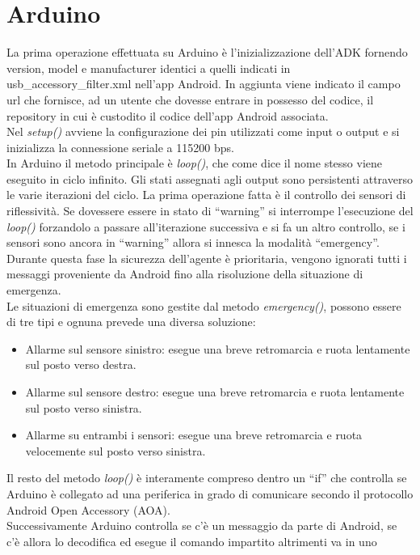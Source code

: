 \section {Arduino} 
La prima operazione effettuata su Arduino è l'inizializzazione dell'ADK fornendo 
version, model e manufacturer identici a quelli indicati in usb\_accessory\_filter.xml 
nell'app Android. In aggiunta viene indicato il campo url che fornisce, ad un utente
che dovesse entrare in possesso del codice, il repository in cui è custodito il 
codice dell'app Android associata.\\
Nel \emph{setup()} avviene la configurazione dei pin utilizzati come input o output e si inizializza
la connessione seriale a 115200 bps.\\
In Arduino il metodo principale è \emph{loop()}, che come dice il nome stesso viene eseguito
in ciclo infinito. Gli stati assegnati agli output sono persistenti attraverso 
le varie iterazioni del ciclo.
La prima operazione fatta è il controllo dei sensori di riflessività. Se dovessere 
essere in stato di ``warning'' si interrompe l'esecuzione del \emph{loop()} 
forzandolo a passare all'iterazione successiva e si fa un altro controllo, se i 
sensori sono ancora in ``warning'' allora si innesca la modalità ``emergency''.
Durante questa fase la sicurezza dell'agente è prioritaria, vengono ignorati tutti 
i messaggi proveniente da Android fino alla risoluzione della situazione di emergenza.\\
Le situazioni di emergenza sono gestite dal metodo \emph{emergency()}, possono 
essere di tre tipi e ognuna prevede una diversa soluzione:
\begin{itemize}
	\item Allarme sul sensore sinistro: esegue una breve retromarcia 
	e ruota lentamente sul posto verso destra.
	\item Allarme sul sensore destro: esegue una breve retromarcia 
	e ruota lentamente sul posto verso sinistra.
	\item Allarme su entrambi i sensori: esegue una breve retromarcia 
	e ruota velocemente sul posto verso sinistra.
\end{itemize}
Il resto del metodo \emph{loop()} è interamente compreso dentro un
``if'' che controlla se Arduino è collegato ad una periferica in grado di 
comunicare secondo il protocollo Android Open Accessory (AOA).\\
Successivamente Arduino controlla se c'è un messaggio da parte di Android,
se c'è allora lo decodifica ed esegue il comando impartito altrimenti va in uno 
